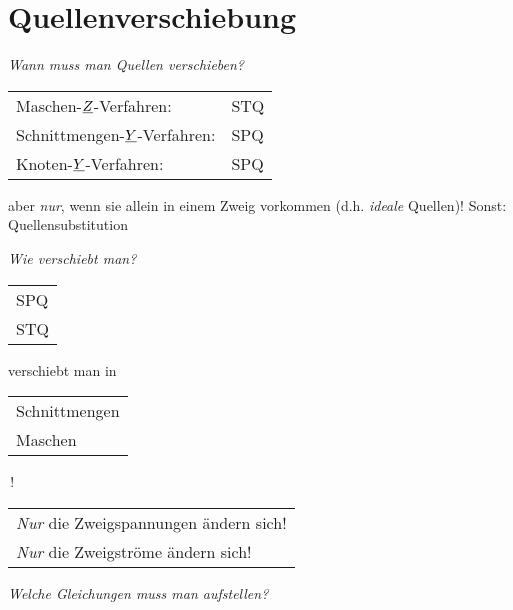 
\chapter{Quellenverschiebung}

\emph{Wann muss man Quellen verschieben?}

\begin{minipage}{0.5\textwidth}
\quad\begin{tabular}{@{}ll}
  Maschen-$\underline{Z}$-Verfahren:       & STQ \\
  Schnittmengen-$\underline{Y}$-Verfahren: & SPQ \\
  Knoten-$\underline{Y}$-Verfahren:        & SPQ
\end{tabular}
\end{minipage}
\begin{minipage}{0.5\textwidth}
  aber \emph{nur}, wenn sie allein in einem Zweig vorkommen
  (d.h. \emph{ideale} Quellen)! Sonst: Quellensubstitution
\end{minipage}

\emph{Wie verschiebt man?}

\begin{minipage}{0.5\textwidth}
\quad\begin{tabular}{@{}l}SPQ\\STQ\end{tabular}verschiebt
man in \begin{tabular}{@{}l@{}}Schnittmengen\\Maschen\end{tabular}\,!
\end{minipage}
\begin{minipage}{0.5\textwidth}
\begin{tabular}{@{$\to$\,}l}
  \emph{Nur} die Zweigspannungen ändern sich!\\
  \emph{Nur} die Zweigströme ändern sich!\\
\end{tabular}
\end{minipage}


\emph{Welche Gleichungen muss man aufstellen?}

